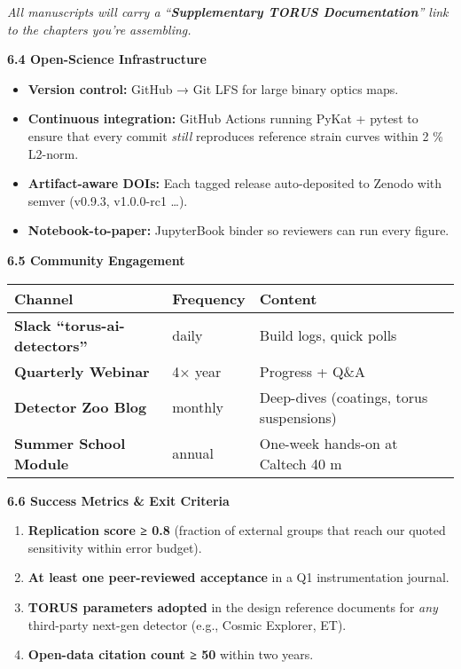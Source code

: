 \documentclass[]{article}
\begin{document}
\emph{All manuscripts will carry a ``\textbf{Supplementary TORUS
Documentation}'' link to the chapters you're assembling.}

\textbf{6.4 Open-Science Infrastructure}

\begin{itemize}
\item
  \textbf{Version control:} GitHub → Git LFS for large binary optics
  maps.
\item
  \textbf{Continuous integration:} GitHub Actions running PyKat + pytest
  to ensure that every commit \emph{still} reproduces reference strain
  curves within 2 \% L2-norm.
\item
  \textbf{Artifact-aware DOIs:} Each tagged release auto-deposited to
  Zenodo with semver (v0.9.3, v1.0.0-rc1 \ldots{}).
\item
  \textbf{Notebook-to-paper:} JupyterBook binder so reviewers can run
  every figure.
\end{itemize}

\textbf{6.5 Community Engagement}

\begin{longtable}[]{@{}lll@{}}
\toprule
\textbf{Channel} & \textbf{Frequency} & \textbf{Content}\tabularnewline
\midrule
\endhead
\textbf{Slack ``torus-ai-detectors''} & daily & Build logs, quick
polls\tabularnewline
\textbf{Quarterly Webinar} & 4× year & Progress + Q\&A\tabularnewline
\textbf{Detector Zoo Blog} & monthly & Deep-dives (coatings, torus
suspensions)\tabularnewline
\textbf{Summer School Module} & annual & One-week hands-on at Caltech 40
m\tabularnewline
\bottomrule
\end{longtable}

\textbf{6.6 Success Metrics \& Exit Criteria}

\begin{enumerate}
\def\labelenumi{\arabic{enumi}.}
\item
  \textbf{Replication score ≥ 0.8} (fraction of external groups that
  reach our quoted sensitivity within error budget).
\item
  \textbf{At least one peer-reviewed acceptance} in a Q1 instrumentation
  journal.
\item
  \textbf{TORUS parameters adopted} in the design reference documents
  for \emph{any} third-party next-gen detector (e.g., Cosmic Explorer,
  ET).
\item
  \textbf{Open-data citation count ≥ 50} within two years.
\end{enumerate}
\end{document}
